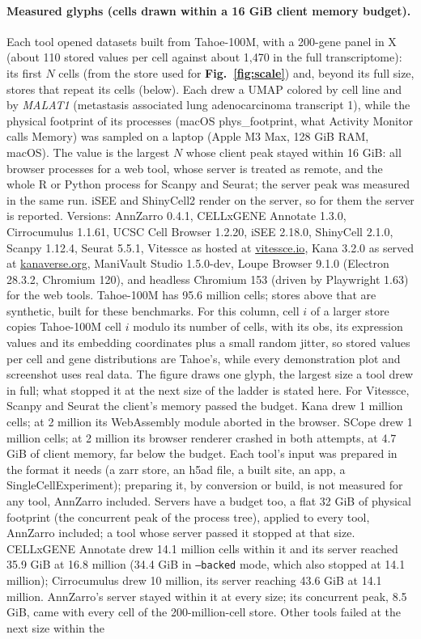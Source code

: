 \documentclass[11pt]{article}
\begin{document}
\paragraph{Measured glyphs (cells drawn within a 16 GiB client memory budget).} Each tool opened datasets built from Tahoe-100M, with a 200-gene panel in X (about 110 stored values per cell against about 1,470 in the full transcriptome): its first $N$ cells (from the store used for \textbf{Fig.~\ref{fig:scale}}) and, beyond its full size, stores that repeat its cells (below). Each drew a UMAP colored by cell line and by \textit{MALAT1} (metastasis associated lung adenocarcinoma transcript 1), while the physical footprint of its processes (macOS phys\_footprint, what Activity Monitor calls Memory) was sampled on a laptop (Apple M3 Max, 128 GiB RAM, macOS). The value is the largest $N$ whose client peak stayed within 16 GiB: all browser processes for a web tool, whose server is treated as remote, and the whole R or Python process for Scanpy and Seurat; the server peak was measured in the same run. iSEE and ShinyCell2 render on the server, so for them the server is reported. Versions: AnnZarro 0.4.1, CELLxGENE Annotate 1.3.0, Cirrocumulus 1.1.61, UCSC Cell Browser 1.2.20, iSEE 2.18.0, ShinyCell 2.1.0, Scanpy 1.12.4, Seurat 5.5.1, Vitessce as hosted at \href{https://vitessce.io}{vitessce.io}, Kana 3.2.0 as served at \href{https://kanaverse.org/kana/}{kanaverse.org}, ManiVault Studio 1.5.0-dev, Loupe Browser 9.1.0 (Electron 28.3.2, Chromium 120), and headless Chromium 153 (driven by Playwright 1.63) for the web tools. Tahoe-100M has 95.6 million cells; stores above that are synthetic, built for these benchmarks. For this column, cell $i$ of a larger store copies Tahoe-100M cell $i$ modulo its number of cells, with its obs, its expression values and its embedding coordinates plus a small random jitter, so stored values per cell and gene distributions are Tahoe's, while every demonstration plot and screenshot uses real data. The figure draws one glyph, the largest size a tool drew in full; what stopped it at the next size of the ladder is stated here. For Vitessce, Scanpy and Seurat the client's memory passed the budget. Kana drew 1 million cells; at 2 million its WebAssembly module aborted in the browser. SCope drew 1 million cells; at 2 million its browser renderer crashed in both attempts, at 4.7 GiB of client memory, far below the budget. Each tool's input was prepared in the format it needs (a zarr store, an h5ad file, a built site, an app, a SingleCellExperiment); preparing it, by conversion or build, is not measured for any tool, AnnZarro included. Servers have a budget too, a flat 32 GiB of physical footprint (the concurrent peak of the process tree), applied to every tool, AnnZarro included; a tool whose server passed it stopped at that size. CELLxGENE Annotate drew 14.1 million cells within it and its server reached 35.9 GiB at 16.8 million (34.4 GiB in \texttt{--backed} mode, which also stopped at 14.1 million); Cirrocumulus drew 10 million, its server reaching 43.6 GiB at 14.1 million. AnnZarro's server stayed within it at every size; its concurrent peak, 8.5 GiB, came with every cell of the 200-million-cell store. Other tools failed at the next size within the 
\end{document}
